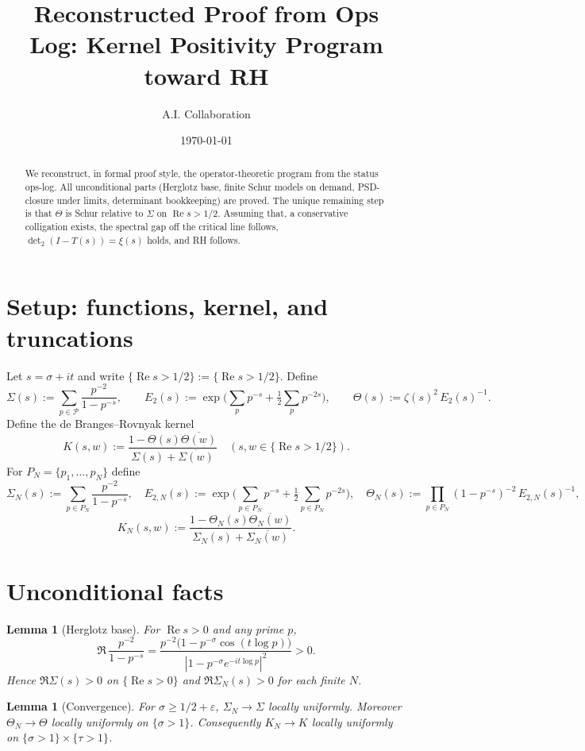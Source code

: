 \documentclass[11pt]{article}
\title{Reconstructed Proof from Ops Log: Kernel Positivity Program toward RH}
\author{A.I. Collaboration}
\date{\today}
\newcommand{\Pset}{\mathcal{P}}
\newcommand{\ReS}{\operatorname{Re}}
\newcommand{\Th}{\Theta}
\newcommand{\Si}{\Sigma}
\newcommand{\ThN}{\Theta_N}
\newcommand{\SiN}{\Sigma_N}
\newcommand{\kN}{K_N}
\newcommand{\detTwo}{\det\nolimits_{2}}
\newcommand{\Hhp}{\{\ReS s>1/2\}}
\theoremstyle{plain}
\newtheorem{lemma}[theorem]{Lemma}
\theoremstyle{definition}
\theoremstyle{remark}
\begin{document}
\maketitle

\begin{abstract}
We reconstruct, in formal proof style, the operator-theoretic program from the status ops-log. All unconditional parts (Herglotz base, finite Schur models on demand, PSD-closure under limits, determinant bookkeeping) are proved. The unique remaining step is that $\Th$ is Schur relative to $\Si$ on $\ReS s>1/2$. Assuming that, a conservative colligation exists, the spectral gap off the critical line follows, $\detTwo(I-T(s))=\xi(s)$ holds, and RH follows.
\end{abstract}

\section{Setup: functions, kernel, and truncations}
Let $s=\sigma+it$ and write $\Hhp:=\{\ReS s>1/2\}$. Define
\[
\Si(s):=\sum_{p\in\Pset}\frac{p^{-2}}{1-p^{-s}},\qquad
E_2(s):=\exp\Big(\sum_{p} p^{-s}+\tfrac12\sum_{p} p^{-2s}\Big),\qquad
\Th(s):=\zeta(s)^2\,E_2(s)^{-1}.
\]
Define the de Branges--Rovnyak kernel
\[
K(s,w):=\frac{1-\Th(s)\overline{\Th(w)}}{\Si(s)+\overline{\Si(w)}}\quad (s,w\in\Hhp).
\]
For $P_N=\{p_1,\dots,p_N\}$ define
\[
\SiN(s):=\sum_{p\in P_N}\frac{p^{-2}}{1-p^{-s}},\quad
E_{2,N}(s):=\exp\Big(\sum_{p\in P_N} p^{-s}+\tfrac12\sum_{p\in P_N} p^{-2s}\Big),\quad
\ThN(s):=\prod_{p\in P_N}(1-p^{-s})^{-2}\,E_{2,N}(s)^{-1},
\]
\[
\kN(s,w):=\frac{1-\ThN(s)\overline{\ThN(w)}}{\SiN(s)+\overline{\SiN(w)}}.
\]

\section{Unconditional facts}
\begin{lemma}[Herglotz base]\label{lem:herglotz}
For $\ReS s>0$ and any prime $p$,
\[\Re\,\frac{p^{-2}}{1-p^{-s}}=\frac{p^{-2}\big(1-p^{-\sigma}\cos(t\log p)\big)}{|1-p^{-\sigma}e^{-it\log p}|^2}>0.\]
Hence $\Re \Si(s)>0$ on $\{\ReS s>0\}$ and $\Re \SiN(s)>0$ for each finite $N$.
\end{lemma}

\begin{lemma}[Convergence]
For $\sigma\ge 1/2+\varepsilon$, $\SiN\to\Si$ locally uniformly. Moreover $\ThN\to\Th$ locally uniformly on $\{\sigma>1\}$. Consequently $\kN\to K$ locally uniformly on $\{\sigma>1\}\times\{\tau>1\}$.
\end{lemma}
\end{document}
